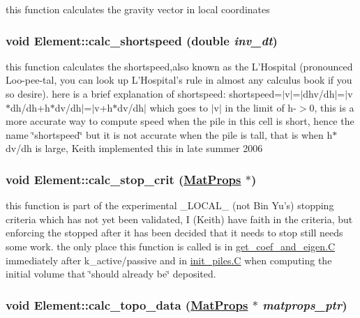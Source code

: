 this function calculates the gravity vector in local coordinates 

\hypertarget{classElement_a81}{
\subsubsection[calc\_\-shortspeed]{\setlength{\rightskip}{0pt plus 5cm}void Element::calc\_\-shortspeed (double {\em inv\_\-dt})}}
\label{classElement_a81}


this function calculates the shortspeed,also known as the L'Hospital (pronounced Loo-pee-tal, you can look up L'Hospital's rule in almost any calculus book if you so desire). here is a brief explanation of shortspeed: shortspeed=$|$v$|$=$|$dhv/dh$|$=$|$v$\ast$dh/dh+h$\ast$dv/dh$|$=$|$v+h$\ast$dv/dh$|$ which goes to $|$v$|$ in the limit of h-$>$0, this is a more accurate way to compute speed when the pile in this cell is short, hence the name \char`\"{}shortspeed\char`\"{} but it is not accurate when the pile is tall, that is when h$\ast$dv/dh is large, Keith implemented this in late summer 2006 

\hypertarget{classElement_a105}{
\subsubsection[calc\_\-stop\_\-crit]{\setlength{\rightskip}{0pt plus 5cm}void Element::calc\_\-stop\_\-crit (\hyperlink{structMatProps}{Mat\-Props} $\ast$)}}
\label{classElement_a105}


this function is part of the experimental \_\-LOCAL\_\- (not Bin Yu's) stopping criteria which has not yet been validated, I (Keith) have faith in the criteria, but enforcing the stopped after it has been decided that it needs to stop still needs some work. the only place this function is called is in \hyperlink{constant_8h_a21}{get\_\-coef\_\-and\_\-eigen.C} immediately after k\_\-active/passive and in \hyperlink{constant_8h_a21}{init\_\-piles.C} when computing the initial volume that \char`\"{}should already be\char`\"{} deposited. 

\hypertarget{classElement_a95}{
\subsubsection[calc\_\-topo\_\-data]{\setlength{\rightskip}{0pt plus 5cm}void Element::calc\_\-topo\_\-data (\hyperlink{structMatProps}{Mat\-Props} $\ast$ {\em matprops\_\-ptr})}}
\label{classElement_a95}


